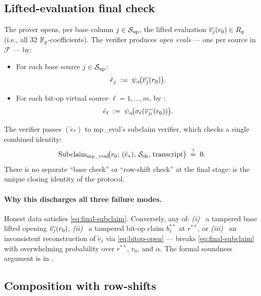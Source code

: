 \subsection{Lifted-evaluation final check}
\label{sec:final-check}

The prover opens, per base column $j \in \mathcal{S}_{\mathrm{up}}$, the lifted evaluation
$\overline{v_j}(r_0) \in R_q$ (i.e., all $32$ $\mathbb{F}_q$-coefficients).
The verifier produces \emph{open evals} — one per source in
$\mathcal{F}$ — by:
\begin{itemize}[leftmargin=2em]
  \item For each base source $j \in \mathcal{S}_{\mathrm{up}}$:
  \begin{equation}
  \label{eq:base-open}
    \tilde e_j \;:=\; \psi_{\alpha}\!\big(\overline{v_j}(r_0)\big).
  \end{equation}
  \item For each bit-op virtual source $\ell = 1,\ldots,m$, by
    :
  \begin{equation}
  \label{eq:bitop-open}
    \tilde e_{\ell} \;:=\; \psi_{\alpha}\!\big(\sigma_{\ell}(\overline{v_{j_\ell}}(r_0))\big).
  \end{equation}
\end{itemize}
The verifier passes $(\tilde e_*)$ to mp\_eval's subclaim verifier,
which checks a single combined identity:
\begin{equation}
\label{eq:final-subclaim}
  \mathrm{Subclaim}_{\mathrm{mp\_eval}}\!\big(r_0;\, (\tilde e_*),\, \mathcal{S}_{\mathrm{sh}},\, \mathrm{transcript}\big) \;\stackrel{?}{=}\; 0.
\end{equation}
There is no separate ``base check'' or ``row-shift check'' at the
final stage:  is the unique closing identity
of the protocol.

\paragraph{Why this discharges all three failure modes.} Honest data
satisfies \cref{eq:final-subclaim}. Conversely, any of:
\emph{(i)}~ a tampered base lifted opening $\overline{v_j}(r_0)$,
\emph{(ii)}~ a tampered bit-op claim $b_{\ell}^{**}$ at $r^{**}$, or
\emph{(iii)}~ an inconsistent reconstruction of $\tilde e_{\ell}$ via
\cref{eq:bitop-open} — breaks \cref{eq:final-subclaim} with
overwhelming probability over $r^{**}$, $r_0$, and $\alpha$. The
formal soundness argument is in .

\subsection{Composition with row-shifts}
\label{sec:composition}

